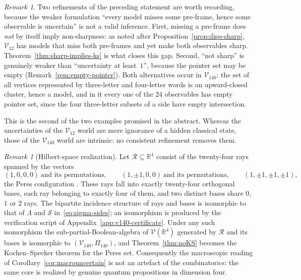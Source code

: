 \documentclass{article}   	%
\theoremstyle{plain}
\theoremstyle{definition}
\theoremstyle{remark}
\newtheorem{remark}[theorem]{Remark}
\begin{document}
\begin{remark}
\label{rem:macro-careful}
Two refinements of the preceding statement are worth recording, because the
weaker formulation ``every model misses some pre-frame, hence some observable
is uncertain'' is not a valid inference.  First, missing a pre-frame does
\emph{not} by itself imply non-sharpness: as noted after
Proposition~\ref{prop:disp-sharp}, $\mathcal V_{12}$ has models that miss both
pre-frames and yet make both observables sharp.  Theorem~\ref{thm:sharp-implies-ks}
is what closes this gap.  Second, ``not sharp'' is genuinely weaker than
``uncertainty at least~$1$'', because the pointer set may be empty
(Remark~\ref{rem:empty-pointer}).  Both alternatives occur in
$\mathcal V_{140}$: the set of all vertices represented by three-letter and
four-letter words is an upward-closed cluster, hence a model, and in it every
one of the $24$ observables has empty pointer set, since the four three-letter
subsets of a side have empty intersection.
\end{remark}
This is the second of the two examples promised in the abstract.
Whereas the uncertainties of the $\mathcal V_{12}$ world are mere ignorance of a
hidden classical state, those of the $\mathcal V_{140}$ world are intrinsic: no
consistent refinement removes them.

\begin{remark}[Hilbert-space realization]
\label{rem:peres}
Let $\mathcal R\subseteq\mathbb R^{4}$ consist of the twenty-four rays spanned
by the vectors
\[
(1,0,0,0)\ \text{and its permutations},\qquad
(1,\pm1,0,0)\ \text{and its permutations},\qquad
(1,\pm1,\pm1,\pm1),
\]
the Peres configuration \cite{Peres1991}.  These rays fall into exactly
twenty-four orthogonal bases, each ray belonging to exactly four of them, and
two distinct bases share $0$, $1$ or $2$ rays.  The bipartite incidence
structure of rays and bases is isomorphic to that of $\Lambda$ and
$\mathcal S$ in~\eqref{eq:sigma-sides}; an isomorphism is produced by the
verification script of Appendix~\ref{app:v140-certificate}.  Under any such
isomorphism the sub-partial-Boolean-algebra of $\mathcal V(\mathbb R^{4})$
generated by $\mathcal R$ and its bases is isomorphic to
$(\mathcal V_{140},\Pi_{140})$, and Theorem~\ref{thm:noKS} becomes the
Kochen--Specker theorem for the Peres set.  Consequently the macroscopic
reading of Corollary~\ref{cor:macrouncertain} is not an artefact of the
combinatorics: the same core is realized by genuine quantum propositions in
dimension four.
\end{remark}
\end{document}
